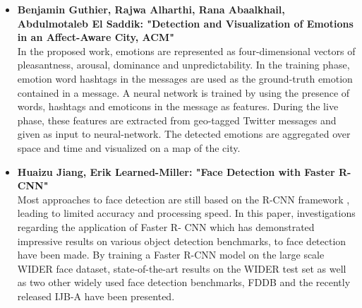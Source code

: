 \documentclass[oneside,a4paper,12pt]{report}
\begin{document}
\begin{normalsize}
\begin{itemize}
		\vspace{5mm}
	\item \textbf{Benjamin Guthier,  Rajwa Alharthi,  Rana Abaalkhail,  Abdulmotaleb El Saddik:  "Detection and Visualization of Emotions in an Affect-Aware City,  ACM"} \cite{guthier14_detec_visual_emotion_affec_aware_city} \\
	In the proposed work, emotions are represented as four-dimensional vectors of pleasantness, arousal, dominance and unpredictability. In the training phase, emotion word hashtags in the messages are used as the ground-truth emotion contained in a message. A neural network is trained by using the presence of words, hashtags and emoticons in the message as features. During the live phase, these features are extracted from geo-tagged Twitter messages and given as input to neural-network. The detected emotions are aggregated over space and time and visualized on a map of the city.
		\vspace{5mm}
	\item \textbf{Huaizu Jiang, Erik Learned-Miller:  "Face Detection with Faster R-CNN"} \cite{jiang17_face_detec_faster_r_cnn} \\
	Most approaches to face detection are still based on the R-CNN framework , leading to limited accuracy and processing speed. In this paper, investigations regarding the application of Faster R- CNN  which has demonstrated impressive results on various object detection benchmarks, to face detection have been made. By training a Faster R-CNN model on the large scale WIDER face dataset, state-of-the-art results on the WIDER test set as well as two other widely used face detection benchmarks, FDDB and the recently released IJB-A have been presented.
		\vspace{5mm}
	

\end{itemize}
\end{normalsize}
\end{document}
